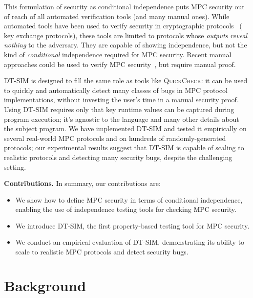 \documentclass[compsoc, conference, a4paper, 10pt, times]{IEEEtran}
\renewcommand{\paragraph}[1]{\vspace*{2pt}\noindent\textbf{#1}}
\newcommand{\toolname}{\textsc{DT-SIM}\xspace}
\begin{document}
This formulation of security as conditional independence puts MPC security out of reach of all automated verification tools (and many manual ones). While automated tools have been used to verify security in cryptographic protocols~\cite{gancher2023owl, barthe2019probabilistic, darais2019language, fournet2011information}  (\eg{} key exchange protocols), these tools are limited to protocols whose \emph{outputs reveal nothing} to the adversary. They are capable of showing independence, but not the kind of \emph{conditional} independence required for MPC security. Recent manual approaches could be used to verify MPC security~\cite{li2023lilac, gancher2023core, haagh2018computer}, but require manual proof.

\toolname is designed to fill the same role as tools like \textsc{QuickCheck}: it can be used to quickly and automatically detect many classes of bugs in MPC protocol implementations, without investing the user's time in a manual security proof.
Using \toolname requires only that key runtime values can be captured during program execution;
it's agnostic to the language and many other details about the subject program.
We have implemented \toolname and tested it empirically on several real-world MPC protocols and on hundreds of randomly-generated protocols; our experimental results suggest that \toolname is capable of scaling to realistic protocols and detecting many security bugs, despite the challenging setting.


\paragraph{Contributions.}
In summary, our contributions are:
%
\begin{itemize}
\item We show how to define MPC security in terms of conditional independence, enabling the use of independence testing tools for checking MPC security.
\item We introduce \toolname, the first property-based testing tool for MPC security.
\item We conduct an empirical evaluation of \toolname, demonstrating its ability to scale to realistic MPC protocols and detect security bugs.
\end{itemize}



\section{Background}
\end{document}
